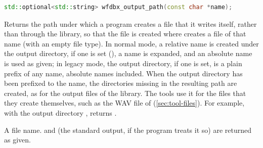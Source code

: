 \begin{lstlisting}[language=C++,style=signature]
std::optional<std::string> wfdbx_output_path(const char *name);
\end{lstlisting}
Returns the path under which a program creates a file that it writes
itself, rather than through the library, so that the file is created where
 creates a file of that name (with an empty file type). In
normal mode, a relative name is created under the output directory, if one
is set (), a \code{\textasciitilde} name is
expanded, and an absolute name is used as given; in legacy mode, the output
directory, if one is set, is a plain prefix of any name, absolute names
included. When the output directory has been prefixed to the name, the
directories missing in the resulting path are created, as for the output
files of the library. The tools use it for the files that they create
themselves, such as the WAV file of  (\cref{sec:tool-files}).
For example, with the output directory ,
 returns .
\begin{params}
\item[name] A file name.  and  (the standard output, if the
  program treats it so) are returned as given.
\end{params}

